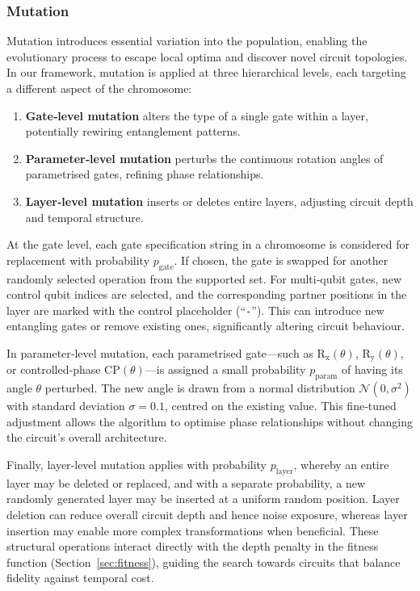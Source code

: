 \documentclass[11pt,a4paper]{article}
\begin{document}
\subsubsection*{Mutation}
Mutation introduces essential variation into the population, enabling the evolutionary process to escape local optima and discover novel circuit topologies. In our framework, mutation is applied at three hierarchical levels, each targeting a different aspect of the chromosome:
\begin{enumerate}
  \item \textbf{Gate‑level mutation} alters the type of a single gate within a layer, potentially rewiring entanglement patterns.
  \item \textbf{Parameter‑level mutation} perturbs the continuous rotation angles of parametrised gates, refining phase relationships.
  \item \textbf{Layer‑level mutation} inserts or deletes entire layers, adjusting circuit depth and temporal structure.
\end{enumerate}

At the gate level, each gate specification string in a chromosome is considered for replacement with probability \(p_{\mathrm{gate}}\). If chosen, the gate is swapped for another randomly selected operation from the supported set. For multi‑qubit gates, new control qubit indices are selected, and the corresponding partner positions in the layer are marked with the control placeholder (“\texttt{-}”). This can introduce new entangling gates or remove existing ones, significantly altering circuit behaviour.\newline

In parameter‑level mutation, each parametrised gate—such as \(\mathrm{R_x}(\theta)\), \(\mathrm{R_y}(\theta)\), or controlled‑phase \(\mathrm{CP}(\theta)\)—is assigned a small probability \(p_{\mathrm{param}}\) of having its angle \(\theta\) perturbed. The new angle is drawn from a normal distribution \(\mathcal{N}(0,\sigma^2)\) with standard deviation \(\sigma=0.1\), centred on the existing value. This fine‑tuned adjustment allows the algorithm to optimise phase relationships without changing the circuit’s overall architecture.\newline

Finally, layer‑level mutation applies with probability \(p_{\mathrm{layer}}\), whereby an entire layer may be deleted or replaced, and with a separate probability, a new randomly generated layer may be inserted at a uniform random position. Layer deletion can reduce overall circuit depth and hence noise exposure, whereas layer insertion may enable more complex transformations when beneficial. These structural operations interact directly with the depth penalty in the fitness function (Section~\ref{sec:fitness}), guiding the search towards circuits that balance fidelity against temporal cost.\newline
\end{document}
